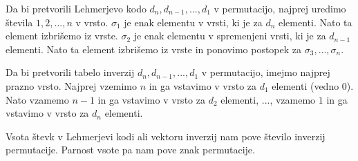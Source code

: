 \documentclass[a4paper, 12pt]{book}
\begin{document}
Da bi pretvorili Lehmerjevo kodo $d_n, d_{n-1}, ..., d_1$ v permutacijo, najprej uredimo števila $1, 2, ..., n$ v vrsto. $\sigma_1$ je enak elementu v vrsti, ki je za $d_{n}$ elementi. Nato ta element izbrišemo iz vrste. $\sigma_2$ je enak elementu v spremenjeni vrsti, ki je za $d_{n-1}$ elementi. Nato ta element izbrišemo iz vrste in ponovimo postopek za $\sigma_3, ..., \sigma_n$.

Da bi pretvorili tabelo inverzij $d_n, d_{n-1}, ..., d_1$ v permutacijo, imejmo najprej prazno vrsto. Najprej vzemimo $n$ in ga vstavimo v vrsto za $d_1$ elementi (vedno $0$). Nato vzamemo $n-1$ in ga vstavimo v vrsto za $d_{2}$ elementi, ..., vzamemo $1$ in ga vstavimo v vrsto za $d_{n}$ elementi.

Vsota števk v Lehmerjevi kodi ali vektoru inverzij nam pove število inverzij permutacije. Parnost vsote pa nam pove znak permutacije.
\end{document}
